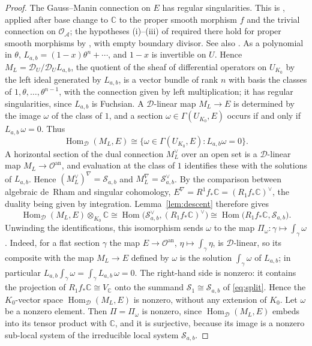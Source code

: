 \documentclass[11pt]{amsart}
\theoremstyle{definition}
\theoremstyle{remark}
\numberwithin{equation}{section}
\newcommand{\C}{\mathbb{C}}
\newcommand{\cS}{\mathcal{S}}
\newcommand{\cO}{\mathcal{O}}
\newcommand{\cD}{\mathcal{D}}
\newcommand{\cA}{\mathcal{A}}
\DeclareMathOperator{\Hom}{Hom}
\newcommand{\Sab}{\cS_{a,b}}
\begin{document}
\begin{proof}
The Gauss--Manin connection on $E$ has regular singularities. This is \citet[Th\'eor\`eme~II.7.9]{Deligne1970}, applied after base change to $\C$ to the proper smooth morphism $f$ and the trivial connection on $\cO_\cA$; the hypotheses (i)--(iii) of \citet[Th\'eor\`eme~II.6.13]{Deligne1970} required there hold for proper smooth morphisms by \citet[Proposition~II.6.14]{Deligne1970}, with empty boundary divisor. See also \citet{Katz1970}. As a polynomial in $\theta$, $L_{a,b}=(1-x)\theta^n+\cdots$, and $1-x$ is invertible on $U$. Hence $M_L=\cD_U/\cD_UL_{a,b}$, the quotient of the sheaf of differential operators on $U_{K_0}$ by the left ideal generated by $L_{a,b}$, is a vector bundle of rank $n$ with basis the classes of $1,\theta,\dots,\theta^{n-1}$, with the connection given by left multiplication; it has regular singularities, since $L_{a,b}$ is Fuchsian. A $\cD$-linear map $M_L\to E$ is determined by the image $\omega$ of the class of $1$, and a section $\omega\in\Gamma(U_{K_0},E)$ occurs if and only if $L_{a,b}\,\omega=0$. Thus
\[
\Hom_{\cD}(M_L,E)\cong\{\omega\in\Gamma(U_{K_0},E):L_{a,b}\omega=0\}.
\]
A horizontal section of the dual connection $M_L^\vee$ over an open set is a $\cD$-linear map $M_L\to\cO^{\mathrm{an}}$, and evaluation at the class of $1$ identifies these with the solutions of $L_{a,b}$. Hence $(M_L^\vee)^\nabla=\Sab$ and $M_L^\nabla=\Sab^\vee$. By the comparison between algebraic de~Rham and singular cohomology, $E^\nabla=R^1f_*\C=(R_1f_*\C)^\vee$, the duality being given by integration. Lemma~\ref{lem:descent} therefore gives
\[
\Hom_{\cD}(M_L,E)\otimes_{K_0}\C\cong\Hom\big(\Sab^\vee,(R_1f_*\C)^\vee\big)\cong\Hom\big(R_1f_*\C,\Sab\big).
\]
Unwinding the identifications, this isomorphism sends $\omega$ to the map $\Pi_\omega:\gamma\mapsto\int_\gamma\omega$. Indeed, for a flat section $\gamma$ the map $E\to\cO^{\mathrm{an}}$, $\eta\mapsto\int_\gamma\eta$, is $\cD$-linear, so its composite with the map $M_L\to E$ defined by $\omega$ is the solution $\int_\gamma\omega$ of $L_{a,b}$; in particular $L_{a,b}\int_\gamma\omega=\int_\gamma L_{a,b}\,\omega=0$. The right-hand side is nonzero: it contains the projection of $R_1f_*\C\cong V_\C$ onto the summand $\cS_1\cong\Sab$ of \eqref{eq:split}. Hence the $K_0$-vector space $\Hom_{\cD}(M_L,E)$ is nonzero, without any extension of $K_0$. Let $\omega$ be a nonzero element. Then $\Pi=\Pi_\omega$ is nonzero, since $\Hom_\cD(M_L,E)$ embeds into its tensor product with $\C$, and it is surjective, because its image is a nonzero sub-local system of the irreducible local system $\Sab$.
\end{proof}
\end{document}
